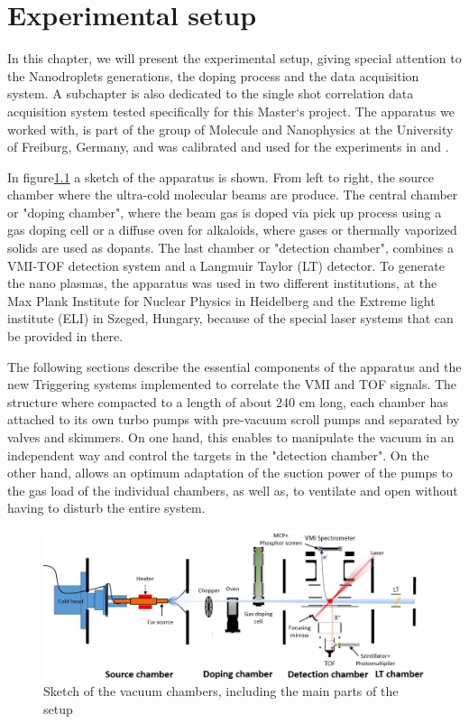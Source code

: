 
\chapter{Experimental setup}

In this chapter, we will present the experimental setup, giving special attention to the Nanodroplets generations, the doping process and the data acquisition system. A subchapter is also dedicated to the single shot correlation data acquisition system tested specifically for this Master`s project.
The apparatus we worked with, is part of the group of Molecule and Nanophysics at the University of Freiburg, Germany, and was calibrated and used for the experiments in \cite{schomas_compact_2017} and \cite{heidenreich_charging_2016}.

In figure\ref{img:setup} a sketch of the apparatus is shown. From left to right, the source chamber where the ultra-cold molecular beams are produce. The central chamber or "doping chamber", where the beam gas is doped via pick up process using a gas doping cell or a diffuse oven for alkaloids, where gases or thermally vaporized solids are used as dopants. The last chamber or "detection chamber", combines a VMI-TOF detection system and a Langmuir Taylor (LT) detector.
To generate the nano plasmas, the apparatus was used in two different institutions, at the Max Plank Institute for Nuclear Physics in Heidelberg and the Extreme light institute (ELI) in Szeged, Hungary, because of the special laser systems that can be provided in there.

The following sections describe the essential components of the apparatus and the new Triggering systems implemented to correlate the VMI and TOF signals.  The structure where compacted to a length of about 240 cm long, each chamber has attached to its own turbo pumps with pre-vacuum scroll pumps and separated by valves and skimmers. On one hand, this enables to manipulate the vacuum in an independent way and control the targets in the "detection chamber". On the other hand, allows an optimum adaptation of the suction power of the pumps to the gas load of the individual chambers, as well as, to ventilate and open without having to disturb the entire system.
\begin{figure}[hbtp] \label{img:setup}

\centering
\includegraphics[width=16 cm]{../Images/setup.png}
\caption{Sketch of the vacuum chambers, including the main parts of the setup}
\end{figure}


